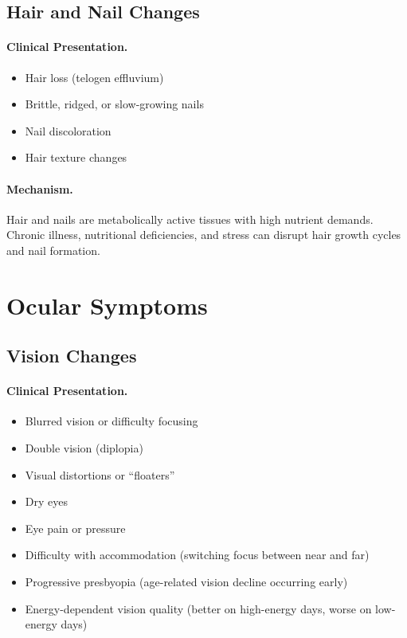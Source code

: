 \subsection{Hair and Nail Changes}
\label{subsec:hair-nails}

\paragraph{Clinical Presentation.}
\begin{itemize}
    \item Hair loss (telogen effluvium)
    \item Brittle, ridged, or slow-growing nails
    \item Nail discoloration
    \item Hair texture changes
\end{itemize}

\paragraph{Mechanism.}
Hair and nails are metabolically active tissues with high nutrient demands. Chronic illness, nutritional deficiencies, and stress can disrupt hair growth cycles and nail formation.

\section{Ocular Symptoms}
\label{sec:ocular}

\subsection{Vision Changes}
\label{subsec:vision}

\paragraph{Clinical Presentation.}
\begin{itemize}
    \item Blurred vision or difficulty focusing
    \item Double vision (diplopia)
    \item Visual distortions or ``floaters''
    \item Dry eyes
    \item Eye pain or pressure
    \item Difficulty with accommodation (switching focus between near and far)
    \item Progressive presbyopia (age-related vision decline occurring early)
    \item Energy-dependent vision quality (better on high-energy days, worse on low-energy days)
\end{itemize}

